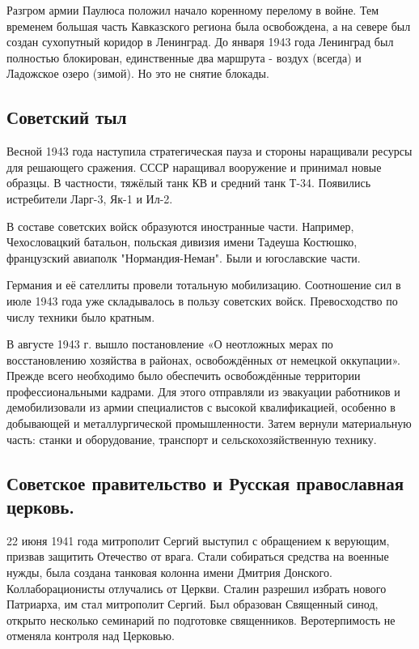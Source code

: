 Разгром армии Паулюса положил начало коренному перелому в войне. Тем временем большая часть Кавказского региона была освобождена, а на севере был создан сухопутный коридор в Ленинград. До января 1943 года Ленинград был полностью блокирован, единственные два маршрута - воздух (всегда) и Ладожское озеро (зимой). Но это не снятие блокады.

\subsection{Советский тыл}

Весной 1943 года наступила стратегическая пауза и стороны наращивали ресурсы для решающего сражения. СССР наращивал вооружение и принимал новые образцы. В частности, тяжёлый танк КВ и средний танк Т-34. Появились истребители Ларг-3, Як-1 и Ил-2.

В составе советских войск образуются иностранные части. Например, Чехословацкий батальон, польская дивизия имени Тадеуша Костюшко, французский авиаполк "Нормандия-Неман". Были и югославские части.

Германия и её сателлиты провели тотальную мобилизацию. Соотношение сил в июле 1943 года уже складывалось в пользу советских войск. Превосходство по числу техники было кратным.

В августе 1943 г. вышло постановление «О неотложных мерах по восстановлению хозяйства в районах, освобождённых от немецкой оккупации». Прежде всего необходимо было обеспечить освобождённые территории профессиональными кадрами. Для этого отправляли из эвакуации работников и демобилизовали из армии специалистов с высокой квалификацией, особенно в добывающей и металлургической промышленности. Затем вернули материальную часть: станки и оборудование, транспорт и сельскохозяйственную технику. 

\subsection{Советское правительство и Русская православная церковь.}

22 июня 1941 года митрополит Сергий выступил с обращением к верующим, призвав защитить Отечество от врага. Стали собираться средства на военные нужды, была создана танковая колонна имени Дмитрия Донского. Коллаборационисты отлучались от Церкви. Сталин разрешил избрать нового Патриарха, им стал митрополит Сергий. Был образован Священный синод, открыто несколько семинарий по подготовке священников. Веротерпимость не отменяла контроля над Церковью.

